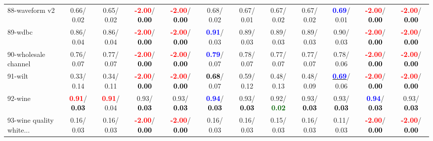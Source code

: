 \begin{table}[h]
\begin{center}
{\begin{tabular}{lc|c|c|c|c|c|c|c|c|c|c}
88-waveform v2 &   0.66/  0.02 &   0.65/  0.02 & \textcolor{red}{\textbf{ -2.00}}/\textcolor{black}{\textbf{  0.00}} & \textcolor{red}{\textbf{ -2.00}}/\textcolor{black}{\textbf{  0.00}} &   0.68/  0.02 &   0.67/  0.01 &   0.67/  0.02 &   0.67/  0.02 & \textcolor{blue}{\textbf{  0.69}}/  0.01 & \textcolor{red}{\textbf{ -2.00}}/\textcolor{black}{\textbf{  0.00}} & \textcolor{red}{\textbf{ -2.00}}/\textcolor{black}{\textbf{  0.00}} \\
89-wdbc &   0.86/  0.04 &   0.86/  0.04 & \textcolor{red}{\textbf{ -2.00}}/\textcolor{black}{\textbf{  0.00}} & \textcolor{red}{\textbf{ -2.00}}/\textcolor{black}{\textbf{  0.00}} & \textcolor{blue}{\textbf{  0.91}}/  0.03 &   0.89/  0.03 &   0.89/  0.03 &   0.89/  0.03 &   0.90/  0.03 & \textcolor{red}{\textbf{ -2.00}}/\textcolor{black}{\textbf{  0.00}} & \textcolor{red}{\textbf{ -2.00}}/\textcolor{black}{\textbf{  0.00}} \\
90-wholesale channel &   0.76/  0.07 &   0.77/  0.07 & \textcolor{red}{\textbf{ -2.00}}/\textcolor{black}{\textbf{  0.00}} & \textcolor{red}{\textbf{ -2.00}}/\textcolor{black}{\textbf{  0.00}} & \textcolor{blue}{\textbf{  0.79}}/  0.07 &   0.78/  0.07 &   0.77/  0.07 &   0.77/  0.07 &   0.78/  0.06 & \textcolor{red}{\textbf{ -2.00}}/\textcolor{black}{\textbf{  0.00}} & \textcolor{red}{\textbf{ -2.00}}/\textcolor{black}{\textbf{  0.00}} \\
91-wilt &   0.33/  0.14 &   0.34/  0.11 & \textcolor{red}{\textbf{ -2.00}}/\textcolor{black}{\textbf{  0.00}} & \textcolor{red}{\textbf{ -2.00}}/\textcolor{black}{\textbf{  0.00}} & \textcolor{black}{\textbf{  0.68}}/  0.07 &   0.59/  0.12 &   0.48/  0.13 &   0.48/  0.09 & \underline{\textcolor{blue}{\textbf{  0.69}}}/  0.06 & \textcolor{red}{\textbf{ -2.00}}/\textcolor{black}{\textbf{  0.00}} & \textcolor{red}{\textbf{ -2.00}}/\textcolor{black}{\textbf{  0.00}} \\
92-wine & \textcolor{red}{\textbf{  0.91}}/\textcolor{black}{\textbf{  0.03}} & \textcolor{red}{\textbf{  0.91}}/  0.04 &   0.93/\textcolor{black}{\textbf{  0.03}} &   0.93/\textcolor{black}{\textbf{  0.03}} & \textcolor{blue}{\textbf{  0.94}}/\textcolor{black}{\textbf{  0.03}} &   0.93/\textcolor{black}{\textbf{  0.03}} &   0.92/\textcolor{darkgreen}{\textbf{  0.02}} &   0.93/\textcolor{black}{\textbf{  0.03}} &   0.93/\textcolor{black}{\textbf{  0.03}} & \textcolor{blue}{\textbf{  0.94}}/\textcolor{black}{\textbf{  0.03}} &   0.93/\textcolor{black}{\textbf{  0.03}} \\ \hline
93-wine quality white... &   0.16/  0.03 &   0.16/  0.03 & \textcolor{red}{\textbf{ -2.00}}/\textcolor{black}{\textbf{  0.00}} & \textcolor{red}{\textbf{ -2.00}}/\textcolor{black}{\textbf{  0.00}} &   0.16/  0.03 &   0.16/  0.03 &   0.15/  0.03 &   0.16/  0.03 &   0.11/  0.03 & \textcolor{red}{\textbf{ -2.00}}/\textcolor{black}{\textbf{  0.00}} & \textcolor{red}{\textbf{ -2.00}}/\textcolor{black}{\textbf{  0.00}} \\

\end{tabular}}
\end{center}
\end{table}

